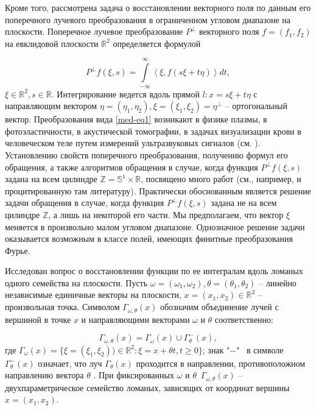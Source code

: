 
Кроме того, рассмотрена задача о восстановлении векторного поля по данным его поперечного лучевого преобразования в ограниченном угловом диапазоне на плоскости. Поперечное лучевое преобразование $P^\bot$ векторного поля $f=(f_1,f_2)$ на евклидовой плоскости $\mathbb R^2$ определяется формулой

\begin{equation}\label{med-eq1}
	P^\bot f(\xi,s)=\int\limits_{-\infty}^\infty\left<\xi,f(s\xi+t\eta)\right>dt,
\end{equation}
$\xi\in\mathbb R^2, s\in\mathbb R$. Интегрирование ведется вдоль прямой $l: x=s\xi+t\eta$ с направляющим вектором $\eta=(\eta_1, \eta_2),  \xi=(\xi_1,\xi_2)=\eta^\bot$ -- ортогональный вектор. Преобразования вида \eqref{med-eq1} возникают в физике плазмы, в фотоэластичности, в акустической томографии, в задачах визуализации крови в человеческом теле путем измерений ультразвуковых сигналов (см. \cite{med-metka1,med-metka2}).
Установлению свойств поперечного преобразования, получению формул его обращения, а также алгоритмов обращения  в случае, когда функция  $P^\bot f(\xi,s)$ задана на всем цилиндре $\mathbb Z=\mathbb S^1\times\mathbb R$, посвящено много работ (см., например, \cite{med-metka2} и процитированную там литературу). Практически обоснованным является решение задачи обращения в случае, когда функция  $P^\bot f(\xi,s)$ задана не на всем цилиндре $\mathbb Z$, а лишь на некоторой его части. Мы предполагаем, что вектор $\xi$ меняется в произвольно малом угловом диапазоне. Однозначное решение задачи оказывается возможным в классе полей, имеющих финитные преобразования Фурье.

Исследован вопрос о восстановлении функции по ее интегралам вдоль ломаных одного семейства на плоскости.
Пусть $\omega=(\omega_1,\omega_2), \theta=(\theta_1, \theta_2)$ -- линейно независимые единичные векторы на плоскости, $x=(x_1, x_2)\in\mathbb R^2$ -- произвольная точка. Символом $\Gamma_{\omega, \theta}(x)$ обозначим объединение лучей с вершиной в точке $x$ и направляющими векторами $\omega$ и $\theta$ соответственно:

$$\Gamma_{\omega, \theta}(x)=\Gamma_{\omega}(x)\cup \Gamma_{\theta}^-(x),$$
где $\Gamma_{\omega}(x)=\{\xi=(\xi_1,\xi_2))\in\mathbb R^2:\xi=x+\theta t, t\geq 0\}$; знак "$-$" $\,$  в символе $\Gamma_{\theta}^-(x)$ означает, что луч  $\Gamma_{\theta}(x)$ проходится в направлении, противоположном направлению вектора $\theta$ . При фиксированных $\omega$ и $\theta$ $\,\Gamma_{\omega, \theta}(x)$ -- двухпараметрическое семейство ломаных, зависящих от координат вершины $x=(x_1,x_2)$.

